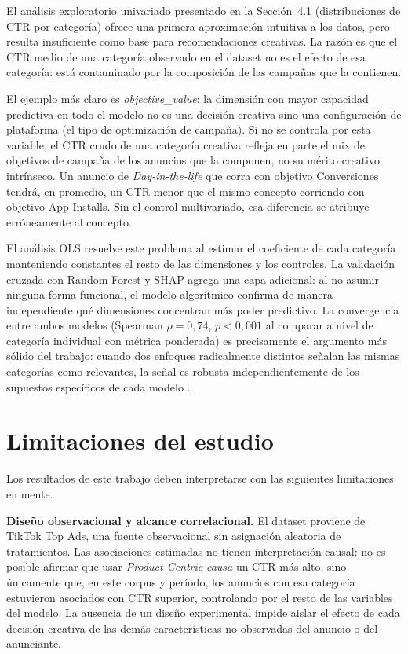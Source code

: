 \documentclass[12pt, a4paper]{report}
\begin{document}
El análisis exploratorio univariado presentado en la Sección~4.1 (distribuciones de CTR
por categoría) ofrece una primera aproximación intuitiva a los datos, pero resulta
insuficiente como base para recomendaciones creativas. La razón es que el CTR medio de
una categoría observado en el dataset no es el efecto de esa categoría: está contaminado
por la composición de las campañas que la contienen.

El ejemplo más claro es \textit{objective\_value}: la dimensión con mayor capacidad
predictiva en todo el modelo no es una decisión creativa sino una configuración de
plataforma (el tipo de optimización de campaña). Si no se controla por esta variable, el
CTR crudo de una categoría creativa refleja en parte el mix de objetivos de campaña de
los anuncios que la componen, no su mérito creativo intrínseco. Un anuncio de
\textit{Day-in-the-life} que corra con objetivo Conversiones tendrá, en promedio, un CTR
menor que el mismo concepto corriendo con objetivo App Installs. Sin el control
multivariado, esa diferencia se atribuye erróneamente al concepto.

El análisis OLS resuelve este problema al estimar el coeficiente de cada categoría
manteniendo constantes el resto de las dimensiones y los controles. La validación cruzada
con Random Forest y SHAP agrega una capa adicional: al no asumir ninguna forma
funcional, el modelo algorítmico confirma de manera independiente qué dimensiones
concentran más poder predictivo. La convergencia entre ambos modelos (Spearman
$\rho = 0{,}74$, $p < 0{,}001$ al comparar a nivel de categoría individual con métrica
ponderada) es precisamente el argumento más sólido del trabajo: cuando dos enfoques
radicalmente distintos señalan las mismas categorías como relevantes, la señal es robusta
independientemente de los supuestos específicos de cada modelo \citep{breiman2001b}.

\section{Limitaciones del estudio}

Los resultados de este trabajo deben interpretarse con las siguientes limitaciones en mente.

\textbf{Diseño observacional y alcance correlacional.} El dataset proviene de TikTok
Top Ads, una fuente observacional sin asignación aleatoria de tratamientos. Las
asociaciones estimadas no tienen interpretación causal: no es posible afirmar que usar
\textit{Product-Centric} \textit{causa} un CTR más alto, sino únicamente que, en este
corpus y período, los anuncios con esa categoría estuvieron asociados con CTR superior,
controlando por el resto de las variables del modelo. La ausencia de un diseño
experimental impide aislar el efecto de cada decisión creativa de las demás características
no observadas del anuncio o del anunciante.
\end{document}
